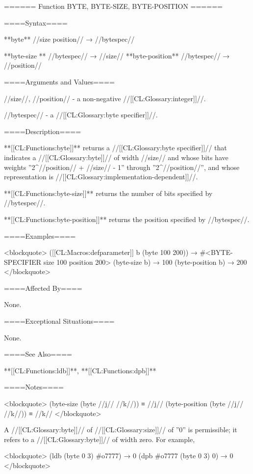 ====== Function BYTE, BYTE-SIZE, BYTE-POSITION ======

====Syntax====

**byte** //size position// → //bytespec//

**byte-size ** //bytespec// → //size// **byte-position** //bytespec// → //position//

====Arguments and Values====

//size//, //position// - a non-negative //[[CL:Glossary:integer]]//.

//bytespec// - a //[[CL:Glossary:byte specifier]]//.

====Description====

**[[CL:Functions:byte]]** returns a //[[CL:Glossary:byte specifier]]// that indicates a //[[CL:Glossary:byte]]// of width //size// and whose bits have weights ''2^{//position// + //size// - 1\/}'' through ''2^//position//'', and whose representation is //[[CL:Glossary:implementation-dependent]]//.

**[[CL:Functions:byte-size]]** returns the number of bits specified by //bytespec//.

**[[CL:Functions:byte-position]]** returns the position specified by //bytespec//.

====Examples====

<blockquote> ([[CL:Macros:defparameter]] b (byte 100 200)) → #<BYTE-SPECIFIER size 100 position 200> (byte-size b) → 100 (byte-position b) → 200 </blockquote>

====Affected By====

None.

====Exceptional Situations====

None.

====See Also====

**[[CL:Functions:ldb]]**, **[[CL:Functions:dpb]]**

====Notes====

<blockquote> (byte-size (byte //j// //k//)) ≡ //j// (byte-position (byte //j// //k//)) ≡ //k// </blockquote>

A //[[CL:Glossary:byte]]// of //[[CL:Glossary:size]]// of ''0'' is permissible; it refers to a //[[CL:Glossary:byte]]// of width zero. For example,

<blockquote> (ldb (byte 0 3) #o7777) → 0 (dpb #o7777 (byte 0 3) 0) → 0 </blockquote>

